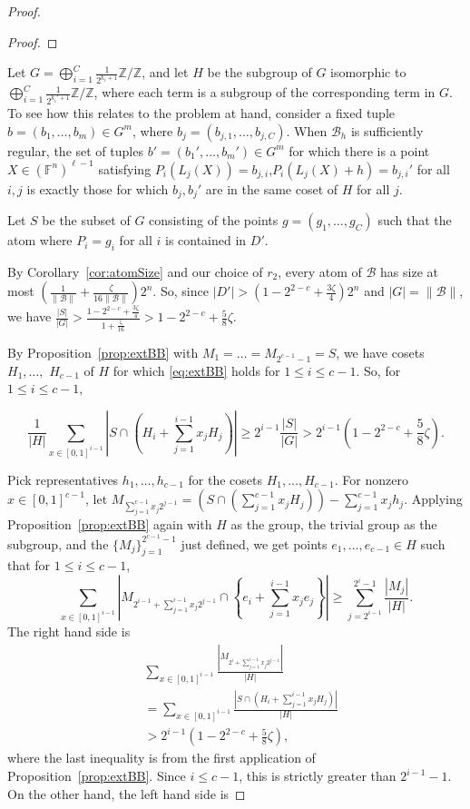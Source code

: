 \documentclass{article}
\theoremstyle{plain}
\theoremstyle{definition}
\theoremstyle{definition}
\theoremstyle{remark}
\numberwithin{equation}{section}
\newcommand{\FF}{\mathbb{F}}
\newcommand{\ZZ}{\mathbb{Z}}
\newcommand{\cB}{\mathcal B}
\begin{document}
\begin{proof}
\begin{proof}
\end{proof}

Let $G=\bigoplus_{i=1}^C \frac{1}{2^{k_i+1}}\ZZ/\ZZ$, and let $H$ be the subgroup of $G$ isomorphic to $\bigoplus_{i=1}^C \frac{1}{2^{k_i'+1}}\ZZ/\ZZ$, where each term is a subgroup of the corresponding term in $G$. To see how this relates to the problem at hand, consider a fixed tuple $b=(b_1,\dots,b_m)\in G^m$, where $b_j=(b_{j,1},\dots,b_{j,C})$. When $\cB_h$ is sufficiently regular, the set of tuples $b'=(b_1',\dots,b_m')\in G^m$ for which there is a point $X\in (\FF^n)^{\ell-1}$ satisfying $P_i(L_j(X))=b_{j,i}$,$P_i(L_j(X)+h)=b_{j,i}'$ for all $i,j$ is exactly those for which $b_j,b_j'$ are in the same coset of $H$ for all $j$.

Let $S$ be the subset of $G$ consisting of the points $g=(g_1,\dots,g_C)$ such that the atom where $P_i=g_i$ for all $i$ is contained in $D'$.

By Corollary~\ref{cor:atomSize} and our choice of $r_2$, every atom of $\cB$ has size at most $(\frac{1}{\|\cB\|}+\frac{\zeta}{16\|\cB\|})2^n$. So, since $|D'|>(1-2^{2-c}+\frac{3\zeta}{4})2^n$ and $|G|=\|\cB\|$, we have $\frac{|S|}{|G|}> \frac{1-2^{2-c}+\frac{3\zeta}{4}}{1+\frac{\zeta}{16}}>1-2^{2-c}+\frac{5}{8}\zeta.$

By Proposition~\ref{prop:extBB} with $M_1=\dots=M_{2^{c-1}-1}=S$, we have cosets $H_1,\dots,$ $H_{c-1}$ of $H$ for which \eqref{eq:extBB} holds for $1\leq i \leq c-1$. So, for $1\leq i\leq c-1$,

\[\frac{1}{|H|}\sum_{x\in[0,1]^{i-1}} \left | S\cap \left( H_i + \sum_{j=1}^{i-1} x_j H_j \right ) \right | \geq 2^{i-1}\frac{|S|}{|G|} > 2^{i-1}(1-2^{2-c}+\frac{5}{8}\zeta).\]

Pick representatives $h_1,\dots,h_{c-1}$ for the cosets $H_1,\dots,H_{c-1}$. For nonzero $x\in [0,1]^{c-1}$, let $M_{\sum_{j=1}^{c-1} x_j 2^{j-1}}=(S\cap (\sum_{j=1}^{c-1} x_j H_j)) - \sum_{j=1}^{c-1} x_j h_j$. Applying Proposition~\ref{prop:extBB} again with $H$ as the group, the trivial group as the subgroup, and the $\{M_j\}_{j=1}^{2^{c-1}-1}$ just defined, we get points $e_1,\dots,e_{c-1}\in H$ such that for $1\leq i\leq c-1$,
\[
    \sum_{x\in[0,1]^{i-1}} \left | M_{2^{i-1}+\sum_{j=1}^{i-1} x_j 2^{j-1}}\cap \left \{ e_i + \sum_{j=1}^{i-1} x_j e_j \right \} \right | \geq \sum_{j=2^{i-1}}^{2^i-1}\frac{|M_j|}{|H|}.
\]
The right hand side is
\begin{align*}
    & \sum_{x\in [0,1]^{i-1}}\frac{|M_{2^i +\sum_{j=1}^{i-1} x_j 2^{j-1}}|}{|H|} \\
    &= \sum_{x\in [0,1]^{i-1}}\frac{|S\cap (H_i+\sum_{j=1}^{i-1} x_j H_j)|}{|H|} \\
    &> 2^{i-1}\left(1-2^{2-c}+\frac{5}{8}\zeta\right),
\end{align*}
where the last inequality is from the first application of Proposition~\ref{prop:extBB}. Since $i\leq c-1$, this is strictly greater than $2^{i-1}-1$.
On the other hand, the left hand side is


\end{proof}
\end{document}
